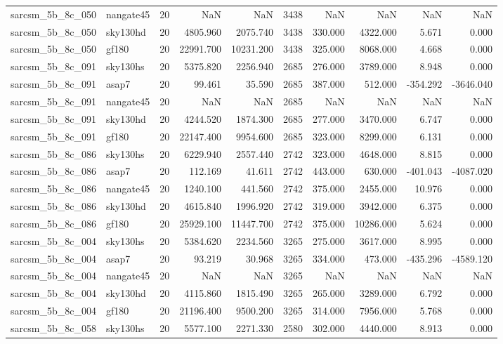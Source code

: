 \documentclass{article}
\begin{document}
\begin{longtable}{llrrrrrrrr}
sarcsm\_5b\_8c\_050 & nangate45 & 20 & NaN & NaN & 3438 & NaN & NaN & NaN & NaN \\
sarcsm\_5b\_8c\_050 & sky130hd & 20 & 4805.960 & 2075.740 & 3438 & 330.000 & 4322.000 & 5.671 & 0.000 \\
sarcsm\_5b\_8c\_050 & gf180 & 20 & 22991.700 & 10231.200 & 3438 & 325.000 & 8068.000 & 4.668 & 0.000 \\
sarcsm\_5b\_8c\_091 & sky130hs & 20 & 5375.820 & 2256.940 & 2685 & 276.000 & 3789.000 & 8.948 & 0.000 \\
sarcsm\_5b\_8c\_091 & asap7 & 20 & 99.461 & 35.590 & 2685 & 387.000 & 512.000 & -354.292 & -3646.040 \\
sarcsm\_5b\_8c\_091 & nangate45 & 20 & NaN & NaN & 2685 & NaN & NaN & NaN & NaN \\
sarcsm\_5b\_8c\_091 & sky130hd & 20 & 4244.520 & 1874.300 & 2685 & 277.000 & 3470.000 & 6.747 & 0.000 \\
sarcsm\_5b\_8c\_091 & gf180 & 20 & 22147.400 & 9954.600 & 2685 & 323.000 & 8299.000 & 6.131 & 0.000 \\
sarcsm\_5b\_8c\_086 & sky130hs & 20 & 6229.940 & 2557.440 & 2742 & 323.000 & 4648.000 & 8.815 & 0.000 \\
sarcsm\_5b\_8c\_086 & asap7 & 20 & 112.169 & 41.611 & 2742 & 443.000 & 630.000 & -401.043 & -4087.020 \\
sarcsm\_5b\_8c\_086 & nangate45 & 20 & 1240.100 & 441.560 & 2742 & 375.000 & 2455.000 & 10.976 & 0.000 \\
sarcsm\_5b\_8c\_086 & sky130hd & 20 & 4615.840 & 1996.920 & 2742 & 319.000 & 3942.000 & 6.375 & 0.000 \\
sarcsm\_5b\_8c\_086 & gf180 & 20 & 25929.100 & 11447.700 & 2742 & 375.000 & 10286.000 & 5.624 & 0.000 \\
sarcsm\_5b\_8c\_004 & sky130hs & 20 & 5384.620 & 2234.560 & 3265 & 275.000 & 3617.000 & 8.995 & 0.000 \\
sarcsm\_5b\_8c\_004 & asap7 & 20 & 93.219 & 30.968 & 3265 & 334.000 & 473.000 & -435.296 & -4589.120 \\
sarcsm\_5b\_8c\_004 & nangate45 & 20 & NaN & NaN & 3265 & NaN & NaN & NaN & NaN \\
sarcsm\_5b\_8c\_004 & sky130hd & 20 & 4115.860 & 1815.490 & 3265 & 265.000 & 3289.000 & 6.792 & 0.000 \\
sarcsm\_5b\_8c\_004 & gf180 & 20 & 21196.400 & 9500.200 & 3265 & 314.000 & 7956.000 & 5.768 & 0.000 \\
sarcsm\_5b\_8c\_058 & sky130hs & 20 & 5577.100 & 2271.330 & 2580 & 302.000 & 4440.000 & 8.913 & 0.000 \\

\end{longtable}
\end{document}

